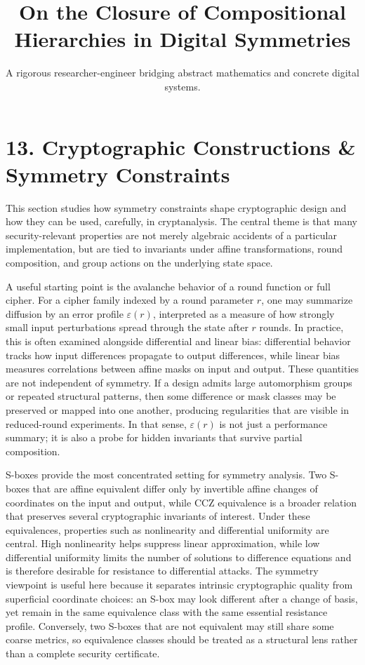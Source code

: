 \documentclass[11pt]{article}
\title{On the Closure of Compositional Hierarchies in Digital Symmetries}
\author{A rigorous researcher-engineer bridging abstract mathematics and concrete digital systems.}
\begin{document}
\section*{13. Cryptographic Constructions \& Symmetry Constraints}

This section studies how symmetry constraints shape cryptographic design and how they can be used, carefully, in cryptanalysis. The central theme is that many security-relevant properties are not merely algebraic accidents of a particular implementation, but are tied to invariants under affine transformations, round composition, and group actions on the underlying state space.

A useful starting point is the avalanche behavior of a round function or full cipher. For a cipher family indexed by a round parameter $r$, one may summarize diffusion by an error profile $\varepsilon(r)$, interpreted as a measure of how strongly small input perturbations spread through the state after $r$ rounds. In practice, this is often examined alongside differential and linear bias: differential behavior tracks how input differences propagate to output differences, while linear bias measures correlations between affine masks on input and output. These quantities are not independent of symmetry. If a design admits large automorphism groups or repeated structural patterns, then some difference or mask classes may be preserved or mapped into one another, producing regularities that are visible in reduced-round experiments. In that sense, $\varepsilon(r)$ is not just a performance summary; it is also a probe for hidden invariants that survive partial composition.

S-boxes provide the most concentrated setting for symmetry analysis. Two S-boxes that are affine equivalent differ only by invertible affine changes of coordinates on the input and output, while CCZ equivalence is a broader relation that preserves several cryptographic invariants of interest. Under these equivalences, properties such as nonlinearity and differential uniformity are central. High nonlinearity helps suppress linear approximation, while low differential uniformity limits the number of solutions to difference equations and is therefore desirable for resistance to differential attacks. The symmetry viewpoint is useful here because it separates intrinsic cryptographic quality from superficial coordinate choices: an S-box may look different after a change of basis, yet remain in the same equivalence class with the same essential resistance profile. Conversely, two S-boxes that are not equivalent may still share some coarse metrics, so equivalence classes should be treated as a structural lens rather than a complete security certificate.
\end{document}
